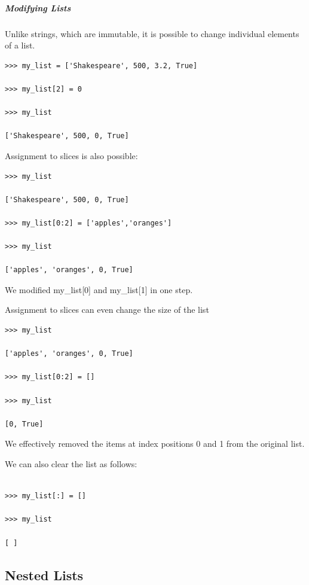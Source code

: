 \documentclass{article}
\begin{document}
\subparagraph{Modifying Lists}

Unlike strings, which are immutable, it is possible to change individual elements of a list.

\begin{lstlisting}
>>> my_list = ['Shakespeare', 500, 3.2, True]

>>> my_list[2] = 0

>>> my_list

['Shakespeare', 500, 0, True]

\end{lstlisting}

Assignment to slices is also possible:

\begin{lstlisting}
>>> my_list

['Shakespeare', 500, 0, True]

>>> my_list[0:2] = ['apples','oranges']

>>> my_list

['apples', 'oranges', 0, True]

\end{lstlisting}

We modified my{\_}list[0] and my{\_}list[1] in one step.

Assignment to slices can even change the size of the list 

\begin{lstlisting}
>>> my_list

['apples', 'oranges', 0, True]

>>> my_list[0:2] = []

>>> my_list

[0, True]

\end{lstlisting}

We effectively removed the items at index positions 0 and 1 from the original list.

We can also clear the list as follows:

\begin{lstlisting}

>>> my_list[:] = []

>>> my_list

[ ]

\end{lstlisting}

\subsection{Nested Lists}
\end{document}
